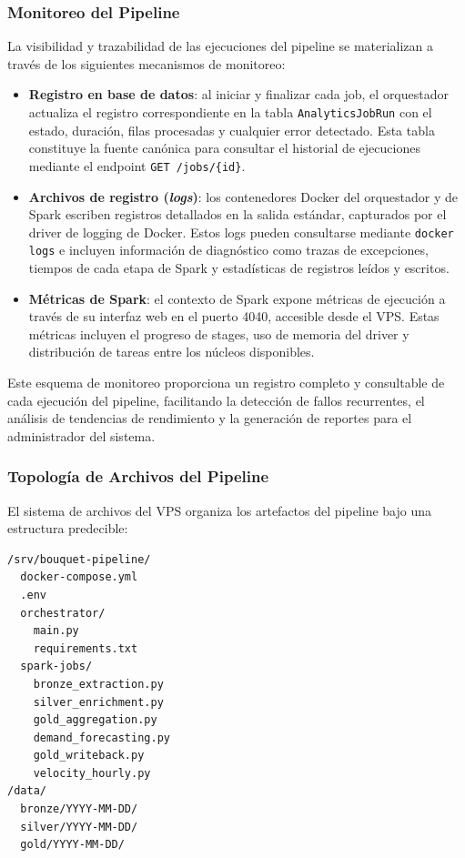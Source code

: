\subsubsection{Monitoreo del Pipeline}

La visibilidad y trazabilidad de las ejecuciones del pipeline se
materializan a través de los siguientes mecanismos de monitoreo:

\begin{itemize}[leftmargin=1.5em]
  \item \textbf{Registro en base de datos}: al iniciar y finalizar cada
  job, el orquestador actualiza el registro correspondiente en la tabla
  \texttt{AnalyticsJobRun} con el estado, duración, filas procesadas y
  cualquier error detectado. Esta tabla constituye la fuente canónica
  para consultar el historial de ejecuciones mediante el endpoint
  \texttt{GET /jobs/\{id\}}.
  \item \textbf{Archivos de registro (\textit{logs})}: los contenedores
  Docker del orquestador y de Spark escriben registros detallados en la
  salida estándar, capturados por el driver de logging de Docker. Estos
  logs pueden consultarse mediante \texttt{docker logs} e incluyen
  información de diagnóstico como trazas de excepciones, tiempos de cada
  etapa de Spark y estadísticas de registros leídos y escritos.
  \item \textbf{Métricas de Spark}: el contexto de Spark expone métricas
  de ejecución a través de su interfaz web en el puerto 4040, accesible
  desde el VPS. Estas métricas incluyen el progreso de stages, uso de
  memoria del driver y distribución de tareas entre los núcleos
  disponibles.
\end{itemize}

Este esquema de monitoreo proporciona un registro completo y consultable
de cada ejecución del pipeline, facilitando la detección de fallos
recurrentes, el análisis de tendencias de rendimiento y la generación de
reportes para el administrador del sistema.

\subsubsection{Topología de Archivos del Pipeline}

El sistema de archivos del VPS organiza los artefactos del pipeline bajo
una estructura predecible:

\begin{lstlisting}[basicstyle=\ttfamily\small,breaklines=true]
/srv/bouquet-pipeline/
  docker-compose.yml
  .env
  orchestrator/
    main.py
    requirements.txt
  spark-jobs/
    bronze_extraction.py
    silver_enrichment.py
    gold_aggregation.py
    demand_forecasting.py
    gold_writeback.py
    velocity_hourly.py
/data/
  bronze/YYYY-MM-DD/
  silver/YYYY-MM-DD/
  gold/YYYY-MM-DD/
\end{lstlisting}

